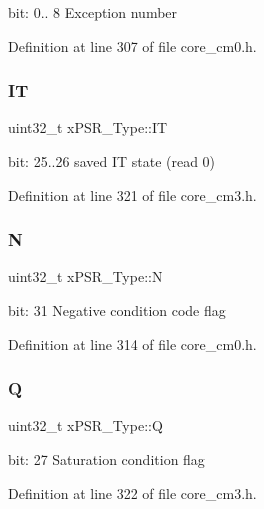 bit\+: 0.. 8 Exception number 

Definition at line 307 of file core\+\_\+cm0.\+h.

\mbox{\label{unionx_p_s_r___type_a3200966922a194d84425e2807a7f1328}} 
\subsubsection{\texorpdfstring{IT}{IT}}
{\footnotesize\ttfamily uint32\+\_\+t x\+P\+S\+R\+\_\+\+Type\+::\+IT}

bit\+: 25..26 saved IT state (read 0) 

Definition at line 321 of file core\+\_\+cm3.\+h.

\mbox{\label{unionx_p_s_r___type_a2db9a52f6d42809627d1a7a607c5dbc5}} 
\subsubsection{\texorpdfstring{N}{N}}
{\footnotesize\ttfamily uint32\+\_\+t x\+P\+S\+R\+\_\+\+Type\+::N}

bit\+: 31 Negative condition code flag 

Definition at line 314 of file core\+\_\+cm0.\+h.

\mbox{\label{unionx_p_s_r___type_add7cbd2b0abd8954d62cd7831796ac7c}} 
\subsubsection{\texorpdfstring{Q}{Q}}
{\footnotesize\ttfamily uint32\+\_\+t x\+P\+S\+R\+\_\+\+Type\+::Q}

bit\+: 27 Saturation condition flag 

Definition at line 322 of file core\+\_\+cm3.\+h.

\mbox{\label{unionx_p_s_r___type_a7eed9fe24ae8d354cd76ae1c1110a658}} 
